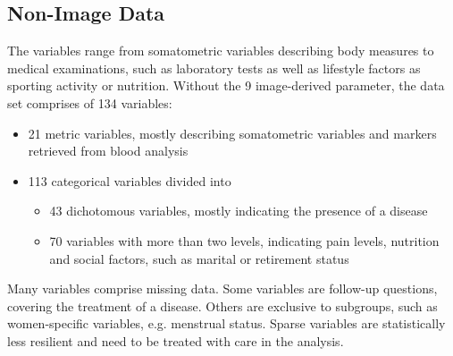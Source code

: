 \documentclass[a4paper,twoside]{style/article}
\newcommand{\com}[1]{\textcolor{orange}{\uline{#1}}}
\begin{document}
\subsection{Non-Image Data}
The variables range from somatometric variables describing body measures to medical examinations, such as laboratory tests as well as lifestyle factors as sporting activity or nutrition.
Without the 9 image-derived parameter, the data set comprises of 134 variables:
\begin{itemize}
	\item 21 metric variables, mostly describing somatometric variables and markers retrieved from blood analysis
	\item 113 categorical variables divided into
	\begin{itemize}
		\item 43 dichotomous variables, mostly indicating the presence of a disease
		\item 70 variables with more than two levels, indicating pain levels, nutrition and social factors, such as marital or retirement status
	\end{itemize}
\end{itemize}
Many variables comprise missing data.
Some variables are follow-up questions, covering the treatment of a disease.
Others are exclusive to subgroups, such as women-specific variables, e.g. menstrual status.
Sparse variables are statistically less resilient and need to be treated with care in the analysis.
\end{document}
